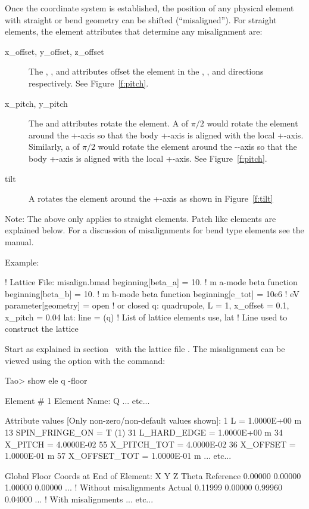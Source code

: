 \documentclass{hitec}
\begin{document}
Once the  coordinate system is established, the position of any physical element with
straight or bend geometry can be shifted (``misaligned''). For straight elements, the element attributes
that determine any misalignment are:
\begin{description}
\item[x_offset, y_offset, z_offset]
The , , and  attributes offset the element in the , ,
and  directions respectively. See Figure~\ref{f:pitch}.
\item[x_pitch, y_pitch]
The  and  attributes rotate the element. A  of $\pi/2$ would rotate the
element around the +-axis so that the body +-axis is aligned with the local
+-axis. Similarly, a  of $\pi/2$ would rotate the element around the --axis so
that the body +-axis is aligned with the local +-axis. See Figure~\ref{f:pitch}.
\item[tilt]
A  rotates the element around the +-axis as shown in Figure~\ref{f:tilt}
\end{description}

Note: The above only applies to straight elements. Patch like elements are explained below. For a
discussion of misalignments for bend type elements see the \bmad manual.

Example:
\begin{code}
! Lattice File: misalign.bmad
beginning[beta_a] = 10.   ! m  a-mode beta function
beginning[beta_b] = 10.   ! m  b-mode beta function
beginning[e_tot] = 10e6   ! eV
parameter[geometry] = open  ! or closed
q: quadrupole, L = 1, x_offset = 0.1, x_pitch = 0.04
lat: line = (q)   ! List of lattice elements
use, lat          ! Line used to construct the lattice
\end{code}

Start \tao as explained in section~ with the lattice file . The
misalignment can be viewed using the  option with the  command:
\begin{code} 
Tao> show ele q -floor

 Element #                1
 Element Name: Q
... etc...

 Attribute values [Only non-zero/non-default values shown]:
    1  L               =  1.0000E+00 m
   13  SPIN_FRINGE_ON  =  T (1)
   31  L_HARD_EDGE     =  1.0000E+00 m
   34  X_PITCH         =  4.0000E-02       55  X_PITCH_TOT   =  4.0000E-02
   36  X_OFFSET        =  1.0000E-01 m     57  X_OFFSET_TOT  =  1.0000E-01 m
... etc...

Global Floor Coords at End of Element:
                X        Y        Z    Theta  
Reference  0.00000  0.00000  1.00000  0.00000 ... ! Without misalignments
Actual     0.11999  0.00000  0.99960  0.04000 ... ! With misalignments
... etc...
\end{code}
\end{document}

